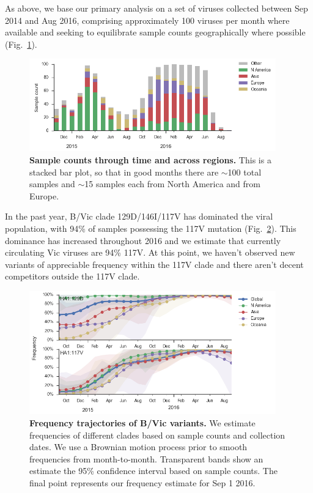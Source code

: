 \documentclass[11pt,oneside,letterpaper]{article}
\begin{document}
As above, we base our primary analysis on a set of viruses collected between Sep 2014 and Aug 2016, comprising approximately 100 viruses per month where available and seeking to equilibrate sample counts geographically where possible (Fig.\ \ref{Vic_counts}).

\begin{figure}[H]
	\centering
	\includegraphics[width=0.95\textwidth]{../figures/sep-2016/Vic_counts.png}
	\caption{\textbf{Sample counts through time and across regions.}
	This is a stacked bar plot, so that in good months there are $\sim$100 total samples and $\sim$15 samples each from North America and from Europe.
	}
	\label{Vic_counts}
\end{figure}

\pagebreak

In the past year, B/Vic clade 129D/146I/117V has dominated the viral population, with 94\% of samples possessing the 117V mutation (Fig.\ \ref{Vic_mutations}). This dominance has increased throughout 2016 and we estimate that currently circulating Vic viruses are 94\% 117V. At this point, we haven't observed new variants of appreciable frequency within the 117V clade and there aren't decent competitors outside the 117V clade.

\begin{figure}[H]
	\centering
	\includegraphics[width=0.95\textwidth]{../figures/sep-2016/Vic_mutations.png}
	\caption{\textbf{Frequency trajectories of B/Vic variants.}
	We estimate frequencies of different clades based on sample counts and collection dates.
	We use a Brownian motion process prior to smooth frequencies from month-to-month.
	Transparent bands show an estimate the 95\% confidence interval based on sample counts.
	The final point represents our frequency estimate for Sep 1 2016.
	}
	\label{Vic_mutations}
\end{figure}
\end{document}
